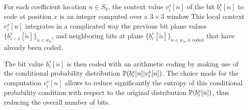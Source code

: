 

For each coefficient location $n \in S_k$, the context value $v_i^s[n]$ of the bit $b_i^s[n]$ to code at position $x$ is an integer computed over a $3 \times 3$ window 
This local context $v_i^s[n]$ integrates in a complicated way the previous bit plane values $\{ b_{i-1}^s[\tilde n] \}_{\tilde n \in w_n}$, and neighboring bits at plane $\{ b_i^s[\tilde n] \}_{\tilde n \in w_n, \tilde n \text{ coded}}$ that have already been coded.

The bit value $b_i^s[n]$ is then coded with an arithmetic coding by making use of the conditional probability distribution $\mathbb{P}( b_i^s[n] | v_i^s[n] )$. The choice made for the computation $v_i^s[n]$ allows to reduce significantly the entropy of this conditional probability condition with respect to the original distribution $\mathbb{P}( b_i^s[n] )$, thus reducing the overall number of bits.
